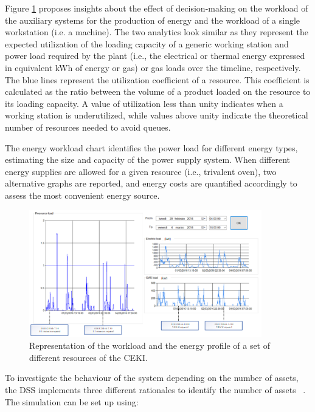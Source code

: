 Figure \ref{fig_prod_CAMST_workload} proposes insights about the effect of decision-making on the workload of the auxiliary systems for the production of energy and the workload of a single workstation (i.e. a machine). The two analytics look similar as they represent the expected utilization of the loading capacity of a generic working station and power load required by the plant (i.e., the electrical or thermal energy expressed in equivalent kWh of energy or gas) or gas loads over the timeline, respectively. The blue lines represent the utilization coefficient of a resource. This coefficient is calculated as the ratio between the volume of a product loaded on the resource to its loading capacity. A value of utilization less than unity indicates when a working station is underutilized, while values above unity indicate the theoretical number of resources needed to avoid queues.\par

The energy workload chart identifies the power load for different energy types, estimating the size and capacity of the power supply system. When different energy supplies are allowed for a given resource (i.e., trivalent oven), two alternative graphs are reported, and energy costs are quantified accordingly to assess the most convenient energy source.

\begin{figure}[hbt!]
\centering
\includegraphics[width=0.9\textwidth]{sectionProduction/design_plant_figures/fig_prod_CAMST_workload.png}
\captionsetup{type=figure}
\caption{Representation of the workload and the energy profile of a set of different resources of the CEKI.}
\label{fig_prod_CAMST_workload}
\end{figure}

To investigate the behaviour of the system depending on the number of assets, the DSS implements three different rationales to identify the number of assets ~\cite{Tufano2019_bookChapterPlantDesign}. The simulation can be set up using:

